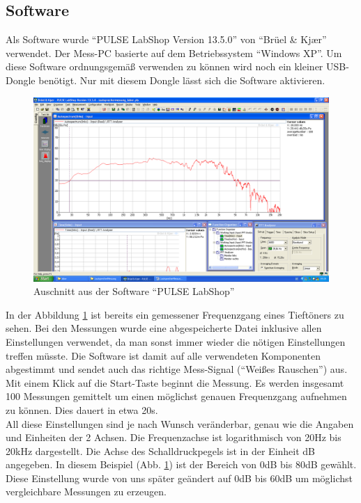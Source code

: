 \newpage
\subsection*{Software}\label{subsec:4.1.1}
Als Software wurde \enquote{PULSE LabShop Version 13.5.0} von \enquote{Brüel \& Kj\ae r} verwendet.
Der Mess-PC basierte auf dem Betriebssystem \enquote{Windows XP}.
Um diese Software ordnungsgemäß verwenden zu können wird noch ein kleiner USB-Dongle benötigt.
Nur mit diesem Dongle lässt sich die Software aktivieren.
\begin{figure} [H]
	\centering
	\includegraphics[width=1\textwidth]{img/LSMessung/VisatonMitSilikonMitWolle.png}
	\caption{Auschnitt aus der Software \enquote{PULSE LabShop}}
	\label{fig:4.1.1.1}
\end{figure}
In der Abbildung \ref{fig:4.1.1.1} ist bereits ein gemessener Frequenzgang eines Tieftöners zu sehen. Bei den Messungen wurde eine abgespeicherte Datei inklusive allen Einstellungen verwendet, da man sonst immer wieder die nötigen Einstellungen treffen müsste.
Die Software ist damit auf alle verwendeten Komponenten abgestimmt und sendet auch das richtige Mess-Signal (\enquote{Weißes Rauschen}) aus.
Mit einem Klick auf die Start-Taste beginnt die Messung.
Es werden insgesamt 100 Messungen gemittelt um einen möglichst genauen Frequenzgang aufnehmen zu können.
Dies dauert in etwa 20s.
\\
All diese Einstellungen sind je nach Wunsch veränderbar, genau wie die Angaben und Einheiten der 2 Achsen.
Die Frequenzachse ist logarithmisch von 20Hz bis 20kHz dargestellt.
Die Achse des Schalldruckpegels ist in der Einheit dB angegeben.
In diesem Beispiel (Abb. \ref{fig:4.1.1.1}) ist der Bereich von 0dB bis 80dB gewählt.
Diese Einstellung wurde von uns später geändert auf 0dB bis 60dB um möglichst vergleichbare Messungen zu erzeugen.

